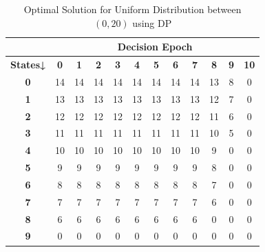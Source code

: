 \documentclass[11pt,a4paper,oneside]{report}
\begin{document}
\begin{table}[]
\centering
\caption{Optimal Solution for Uniform Distribution between $(0,20)$ using DP}
\label{t1}
\begin{tabular}{|c|c|c|c|c|c|c|c|c|c|c|c|}
\hline
\textbf{}        & \multicolumn{11}{c|}{\textbf{Decision Epoch}}                                                                                                 \\ \hline
\textbf{States↓} & \textbf{0} & \textbf{1} & \textbf{2} & \textbf{3} & \textbf{4} & \textbf{5} & \textbf{6} & \textbf{7} & \textbf{8} & \textbf{9} & \textbf{10} \\ \hline
\textbf{0}       & 14         & 14         & 14         & 14         & 14         & 14         & 14         & 14         & 13         & 8          & 0           \\ \hline
\textbf{1}       & 13         & 13         & 13         & 13         & 13         & 13         & 13         & 13         & 12         & 7          & 0           \\ \hline
\textbf{2}       & 12         & 12         & 12         & 12         & 12         & 12         & 12         & 12         & 11         & 6          & 0           \\ \hline
\textbf{3}       & 11         & 11         & 11         & 11         & 11         & 11         & 11         & 11         & 10         & 5          & 0           \\ \hline
\textbf{4}       & 10         & 10         & 10         & 10         & 10         & 10         & 10         & 10         & 9          & 0          & 0           \\ \hline
\textbf{5}       & 9          & 9          & 9          & 9          & 9          & 9          & 9          & 9          & 8          & 0          & 0           \\ \hline
\textbf{6}       & 8          & 8          & 8          & 8          & 8          & 8          & 8          & 8          & 7          & 0          & 0           \\ \hline
\textbf{7}       & 7          & 7          & 7          & 7          & 7          & 7          & 7          & 7          & 6          & 0          & 0           \\ \hline
\textbf{8}       & 6          & 6          & 6          & 6          & 6          & 6          & 6          & 6          & 0          & 0          & 0           \\ \hline
\textbf{9}       & 0          & 0          & 0          & 0          & 0          & 0          & 0          & 0          & 0          & 0          & 0           \\ \hline

\end{tabular}
\end{table}
\end{document}
